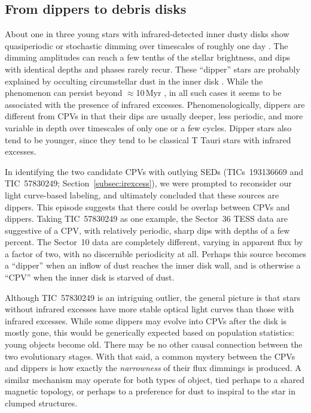 \documentclass[11pt,twocolumn,tighten,linenumbers]{aastex63}
\begin{document}
\subsection{From dippers to debris disks}
\label{subsec:discdippers}

About one in three young stars with infrared-detected inner dusty
disks show quasiperiodic or stochastic dimming over timescales of
roughly one day
\citep[e.g.][]{2010A&A...519A..88A,2010ApJS..191..389C}.  The dimming
amplitudes can reach a few tenths of the stellar brightness, and dips
with identical depths and phases rarely recur.  These ``dipper'' stars
are probably explained by occulting circumstellar dust in the inner
disk
\citep[e.g.][]{2014AJ....147...82C,2016ApJ...816...69A,2021ApJ...908...16R,2022ApJS..263...14C}.
While the phenomenon can persist beyond $\approx$10\,Myr
\citep{2019MNRAS.488.4465G,2022MNRAS.514.1386G}, in all such cases it
seems to be associated with the presence of infrared excesses.
Phenomenologically, dippers are different from CPVs in that their dips
are usually deeper, less periodic, and more variable in depth over
timescales of only one or a few cycles.  Dipper stars also tend to be
younger, since they tend to be classical T Tauri stars with infrared
excesses.

In identifying the two candidate CPVs with outlying SEDs
(TICs~193136669 and TIC~57830249; Section~\ref{subsec:irexcess}), we
were prompted to reconsider our light curve-based labeling, and
ultimately concluded that these sources are dippers.  This episode
suggests that there could be overlap between CPVs and dippers.  Taking
TIC~57830249 as one example, the Sector~36 TESS data are suggestive of
a CPV, with relatively periodic, sharp dips with depths of a few
percent.  The Sector~10 data are completely different, varying in
apparent flux by a factor of two, with no discernible periodicity at
all.  Perhaps this source becomes a ``dipper'' when an inflow of dust
reaches the inner disk wall, and is otherwise a ``CPV'' when the inner
disk is starved of dust.

Although TIC~57830249 is an intriguing outlier, the general picture is
that stars without infrared excesses have more stable optical light
curves than those with infrared excesses.  While some dippers may
evolve into CPVs after the disk is mostly gone, this would be
generically expected based on population statistics: young objects
become old.  There may be no other causal connection between the two
evolutionary stages.  With that said, a common mystery between the
CPVs and dippers is how exactly the {\it narrowness} of their flux
dimmings is produced.  A similar mechanism may operate for both types
of object, tied perhaps to a shared magnetic topology, or perhaps to a
preference for dust to inspiral to the star in clumped structures.
\end{document}

